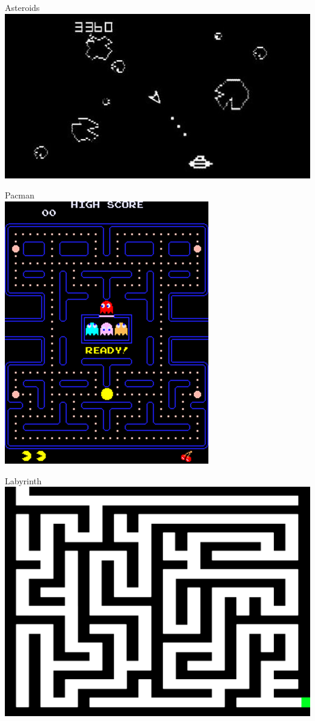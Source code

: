 \begin{minipage}{.45\textwidth}

    \begin{center}Asteroids\\\vspace{4ex} \includegraphics[width=.5\textwidth]{img_asteroids.png}\end{center}
    \begin{center}Pacman\\\vspace{4ex}\includegraphics[width=.3\textwidth]{img_pacman.png}\end{center}
    \begin{center}Labyrinth\\\vspace{4ex}\includegraphics[width=.4\textwidth]{img_maze.png}\end{center}
\end{minipage}
